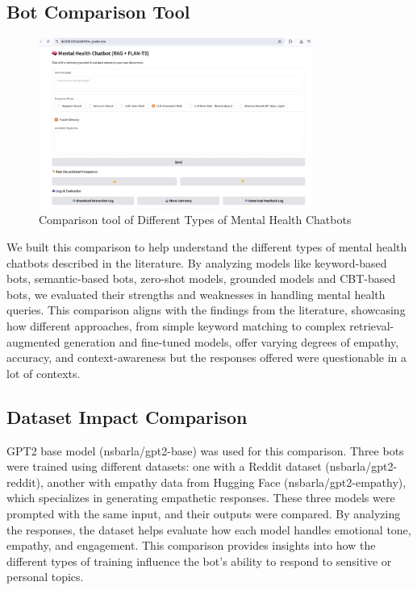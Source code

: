 \subsection{Bot Comparison Tool} 
\begin{figure}[h]
    \centering
    \includegraphics[width=0.8\textwidth]{bot_comparison_tool.jpeg}
    \caption{Comparison tool of Different Types of Mental Health Chatbots}
    \label{fig:bot_comparison}
\end{figure}
We built this comparison to help understand the different types of mental health chatbots described in the literature. By analyzing models like keyword-based bots, semantic-based bots, zero-shot models, grounded models and CBT-based bots, we evaluated their strengths and weaknesses in handling mental health queries. This comparison aligns with the findings from the literature, showcasing how different approaches, from simple keyword matching to complex retrieval-augmented generation and fine-tuned models, offer varying degrees of empathy, accuracy, and context-awareness but the responses offered were questionable in a lot of contexts. 





\subsection{Dataset Impact Comparison} 
GPT2 base model (nsbarla/gpt2-base) was used for this comparison. Three bots were trained using different datasets: one with a Reddit dataset (nsbarla/gpt2-reddit), another with empathy data from Hugging Face (nsbarla/gpt2-empathy), which specializes in generating empathetic responses. These three models were prompted with the same input, and their outputs were compared. By analyzing the responses, the dataset helps evaluate how each model handles emotional tone, empathy, and engagement. This comparison provides insights into how the different types of training influence the bot's ability to respond to sensitive or personal topics.

